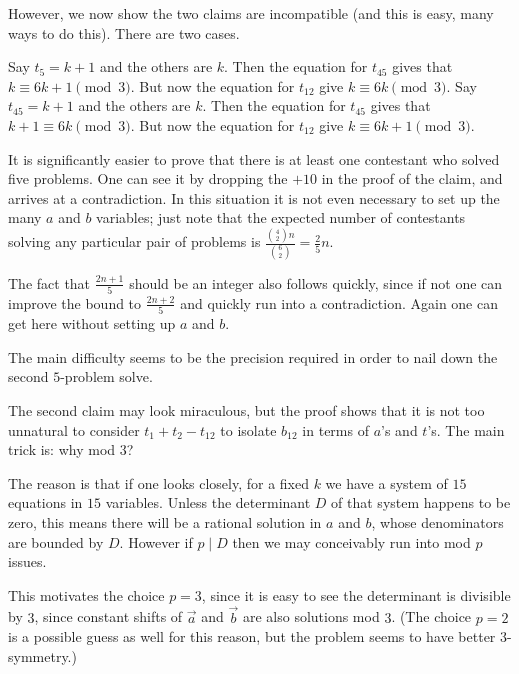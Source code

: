 \documentclass[11pt]{scrartcl}
\begin{document}
However, we now show the two claims are incompatible
(and this is easy, many ways to do this).
There are two cases.
\begin{itemize}
  \ii Say $t_5 = k+1$ and the others are $k$.
  Then the equation for $t_{45}$ gives that $k \equiv 6k+1 \pmod 3$.
  But now the equation for $t_{12}$ give $k \equiv 6k \pmod 3$.
  \ii Say $t_{45} = k+1$ and the others are $k$.
  Then the equation for $t_{45}$ gives that $k+1 \equiv 6k \pmod 3$.
  But now the equation for $t_{12}$ give $k \equiv 6k+1 \pmod 3$.
\end{itemize}


\begin{remark*}
  It is significantly easier to prove that there
  is at least one contestant who solved five problems.
  One can see it by dropping the $+10$ in the proof of the claim,
  and arrives at a contradiction.
  In this situation it is not even necessary to set up
  the many $a$ and $b$ variables;
  just note that the expected number of contestants
  solving any particular pair of problems is
  $\frac{\binom42n}{\binom62} = \frac25n$.

  The fact that $\frac{2n+1}{5}$
  should be an integer also follows quickly,
  since if not one can improve the bound to $\frac{2n+2}{5}$
  and quickly run into a contradiction.
  Again one can get here without setting up $a$ and $b$.

  The main difficulty seems to be the precision required
  in order to nail down the second $5$-problem solve.
\end{remark*}

\begin{remark*}
  The second claim may look miraculous,
  but the proof shows that it is not too unnatural
  to consider $t_1 + t_2 - t_{12}$ to isolate $b_{12}$
  in terms of $a$'s and $t$'s.
  The main trick is: why mod $3$?

  The reason is that if one looks closely, for a
  fixed $k$ we have a system of $15$ equations in $15$ variables.
  Unless the determinant $D$ of that system happens to be zero,
  this means there will be a rational solution in $a$ and $b$,
  whose denominators are bounded by $D$.
  However if $p \mid D$ then we may conceivably run into mod $p$
  issues.

  This motivates the choice $p = 3$,
  since it is easy to see the determinant is divisible by $3$,
  since constant shifts of $\vec a$ and $\vec b$ are also solutions mod $3$.
  (The choice $p = 2$ is a possible guess as well for this reason,
  but the problem seems to have better $3$-symmetry.)
\end{remark*}
\pagebreak
\end{document}
